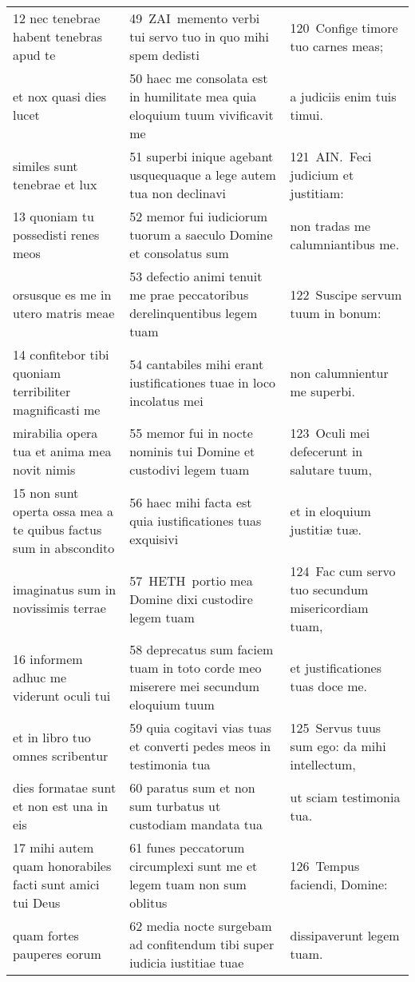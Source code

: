 \documentclass{article}
\begin{document}
\begin{longtable}{@{}p{}p{}p{}@{}}
12 nec tenebrae habent tenebras apud te	&	49 ZAI memento verbi tui servo tuo in quo mihi spem dedisti	&	120 Confige timore tuo carnes meas;	\\
et nox quasi dies lucet	&	50 haec me consolata est in humilitate mea quia eloquium tuum vivificavit me	&	a judiciis enim tuis timui.	\\
similes sunt tenebrae et lux	&	51 superbi inique agebant usquequaque a lege autem tua non declinavi	&	121 AIN. Feci judicium et justitiam:	\\
13 quoniam tu possedisti renes meos	&	52 memor fui iudiciorum tuorum a saeculo Domine et consolatus sum	&	non tradas me calumniantibus me.	\\
orsusque es me in utero matris meae	&	53 defectio animi tenuit me prae peccatoribus derelinquentibus legem tuam	&	122 Suscipe servum tuum in bonum:	\\
14 confitebor tibi quoniam terribiliter magnificasti me	&	54 cantabiles mihi erant iustificationes tuae in loco incolatus mei	&	non calumnientur me superbi.	\\
mirabilia opera tua et anima mea novit nimis	&	55 memor fui in nocte nominis tui Domine et custodivi legem tuam	&	123 Oculi mei defecerunt in salutare tuum,	\\
15 non sunt operta ossa mea a te quibus factus sum in abscondito	&	56 haec mihi facta est quia iustificationes tuas exquisivi	&	et in eloquium justitiæ tuæ.	\\
imaginatus sum in novissimis terrae	&	57 HETH portio mea Domine dixi custodire legem tuam	&	124 Fac cum servo tuo secundum misericordiam tuam,	\\
16 informem adhuc me viderunt oculi tui	&	58 deprecatus sum faciem tuam in toto corde meo miserere mei secundum eloquium tuum	&	et justificationes tuas doce me.	\\
et in libro tuo omnes scribentur	&	59 quia cogitavi vias tuas et converti pedes meos in testimonia tua	&	125 Servus tuus sum ego: da mihi intellectum,	\\
dies formatae sunt et non est una in eis	&	60 paratus sum et non sum turbatus ut custodiam mandata tua	&	ut sciam testimonia tua.	\\
17 mihi autem quam honorabiles facti sunt amici tui Deus	&	61 funes peccatorum circumplexi sunt me et legem tuam non sum oblitus	&	126 Tempus faciendi, Domine:	\\
quam fortes pauperes eorum	&	62 media nocte surgebam ad confitendum tibi super iudicia iustitiae tuae	&	dissipaverunt legem tuam.	\\

\end{longtable}
\end{document}
